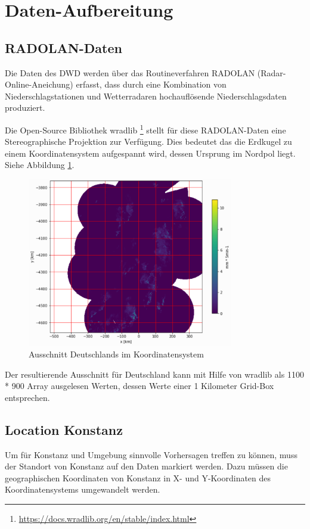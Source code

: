 \section{Daten-Aufbereitung}

\subsection{RADOLAN-Daten}

Die Daten des DWD werden über das Routineverfahren RADOLAN (Radar-Online-Aneichung) erfasst, dass durch eine Kombination von Niederschlagstationen und Wetterradaren hochauflösende Niederschlagsdaten produziert. 

Die Open-Source Bibliothek wradlib \footnote{\url{https://docs.wradlib.org/en/stable/index.html}} stellt für diese RADOLAN-Daten eine Stereographische Projektion zur Verfügung. Dies bedeutet das die Erdkugel zu einem Koordinatensystem aufgespannt wird, dessen Ursprung im Nordpol liegt. Siehe Abbildung  \ref{rz}.

\begin{figure}[H]
	\centering
	\includegraphics[width=0.8\textwidth]{pics/RZ_product.PNG}
	\caption{Ausschnitt Deutschlands im Koordinatensystem}
	\label{rz}
\end{figure}

Der resultierende Ausschnitt für Deutschland kann mit Hilfe von wradlib als 1100 * 900 Array ausgelesen Werten, dessen Werte einer 1 Kilometer Grid-Box entsprechen.

\subsection{Location Konstanz}
\label{locKN}
Um für Konstanz und Umgebung sinnvolle Vorhersagen treffen zu können, muss der Standort von Konstanz auf den Daten markiert werden. Dazu müssen die geographischen Koordinaten von Konstanz in X- und Y-Koordinaten des Koordinatensystems umgewandelt werden.

